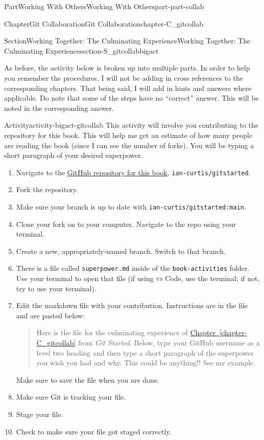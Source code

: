 \documentclass[oneside,10pt,]{book}
\newcommand{\xreffont}{\relax}
\newcommand{\mono}[1]{\texttt{#1}}
\newcommand{\initialism}[1]{\textsc{\MakeLowercase{#1}}}
\newcommand{\pubtitle}[1]{\textsl{#1}}
\begin{document}
\begin{partptx}{Part}{Working With Others}{}{Working With Others}{}{}{part-part-collab}
\begin{chapterptx}{Chapter}{Git Collaboration}{}{Git Collaboration}{}{}{chapter-C_gitcollab}
\begin{sectionptx}{Section}{Working Together: The Culminating Experience}{}{Working Together: The Culminating Experience}{}{}{section-S_gitcollabbigact}
\par
As before, the activity below is broken up into multiple parts. In order to help you remember the procedures, I will not be adding in cross references to the corresponding chapters. That being said, I will add in hints and answers where applicable. Do note that some of the steps have no “correct” answer. This will be noted in the corresponding answer.%
\begin{activity}{Activity}{}{activity-bigact-gitcollab}%
This activity will involve you contributing to the repository for this book. This will help me get an estimate of how many people are reading the book (since I can see the number of forks). You will be typing a short paragraph of your desired superpower.%
\begin{enumerate}[font=\bfseries,label=(\alph*),ref=\alph*]%
\item{}Navigate to the \href{https://github.com/ian-curtis/gitstarted}{GitHub repository for this book}\footnotemark{}, \mono{ian-curtis/gitstarted}.%
\item{}Fork the repository.%
\item{}Make sure your branch is up to date with \mono{ian-curtis/gitstarted:main}.%
\item{}Clone your fork on to your computer. Navigate to the repo using your terminal.%
\item{}Create a new, appropriately-named branch. Switch to that branch.%
\item{}There is a file called \mono{superpower.md} inside of the \mono{book-activities} folder. Use your terminal to open that file (if using \initialism{VS} Code, use the terminal; if not, try to use your terminal).%
\item{}Edit the markdown file with your contribution. Instructions are in the file and are pasted below:%
\begin{quote}%
Here is the file for the culminating experience of \hyperref[chapter-C_gitcollab]{Chapter~{\xreffont\ref{chapter-C_gitcollab}}} from \pubtitle{Git Started}. Below, type your GitHub username as a level two heading and then type a short paragraph of the superpower you wish you had and why. This could be anything!! See my example.%
\end{quote}
Make sure to save the file when you are done.%
\item{}Make sure Git is tracking your file.%
\item{}Stage your file.%
\item{}Check to make sure your file got staged correctly.%

\end{enumerate}
\end{activity}
\end{sectionptx}
\end{chapterptx}
\end{partptx}
\end{document}
